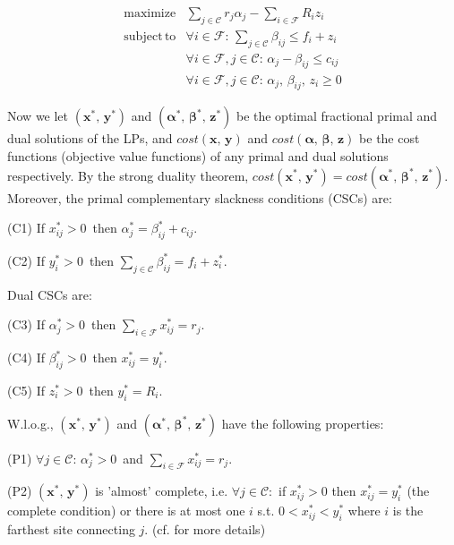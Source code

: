\documentclass[10pt]{llncs}
\begin{document}
{\small 
\begin{equation}
\begin{array}{llc}
\textrm{maximize} & \sum_{j\in\mathcal{C}}r_{j}\alpha_{j}-\sum_{i\in\mathcal{F}}R_{i}z_{i}\\
\mathrm{subject\, to} & \forall i\in\mathcal{F}:\,\sum_{j\in\mathcal{C}}\beta_{ij}\leq f_{i}+z_{i}\\
 & \forall i\in\mathcal{F},j\in\mathcal{C}:\,\alpha_{j}-\beta_{ij}\leq c_{ij}\\
 & \forall i\in\mathcal{F},j\in\mathcal{C}:\,\alpha_{j},\,\beta_{ij},\, z_{i}\geq0
\end{array}\label{eq:ftra-dual}
\end{equation}
}{\small \par}

Now we let $\left(\boldsymbol{x^{*}},\,\boldsymbol{y^{*}}\right)$
and $\left(\boldsymbol{\alpha^{*}},\,\boldsymbol{\beta^{*}},\,\boldsymbol{z^{*}}\right)$
be the optimal fractional primal and dual solutions of the LPs, and
$cost\left(\boldsymbol{x},\,\boldsymbol{y}\right)$ and $cost\left(\boldsymbol{\alpha},\,\boldsymbol{\beta},\,\boldsymbol{z}\right)$
be the cost functions (objective value functions) of any primal and
dual solutions respectively. By the strong duality theorem, $cost\left(\boldsymbol{x^{*}},\,\boldsymbol{y^{*}}\right)=cost\left(\boldsymbol{\alpha^{*}},\,\boldsymbol{\beta^{*}},\,\boldsymbol{z^{*}}\right)$.
Moreover, the primal complementary slackness conditions (CSCs) are:

(C1) If $x_{ij}^{*}>0\,$ then $\alpha_{j}^{*}=\beta_{ij}^{*}+c_{ij}$.

(C2) If $y_{i}^{*}>0\,$ then $\sum_{j\in\mathcal{C}}\beta_{ij}^{*}=f_{i}+z_{i}^{*}$.

Dual CSCs are:

(C3) If $\alpha_{j}^{*}>0\,$ then $\sum_{i\in\mathcal{F}}x_{ij}^{*}=r_{j}$.

(C4) If $\beta_{ij}^{*}>0\,$ then $x_{ij}^{*}=y_{i}^{*}$.

(C5) If $z_{i}^{*}>0\,$ then $y_{i}^{*}=R_{i}$.

W.l.o.g., $\left(\boldsymbol{x^{*}},\,\boldsymbol{y^{*}}\right)$
and $\left(\boldsymbol{\alpha^{*}},\,\boldsymbol{\beta^{*}},\,\boldsymbol{z^{*}}\right)$
have the following properties:

(P1) $\forall j\in\mathcal{C}:\,\alpha_{j}^{*}>0\,$ and $\sum_{i\in\mathcal{F}}x_{ij}^{*}=r_{j}$.

(P2) $\left(\boldsymbol{x^{*}},\,\boldsymbol{y^{*}}\right)$ is 'almost'
complete, i.e. $\forall j\in\mathcal{C}:$ if $x_{ij}^{*}>0$ then
$x_{ij}^{*}=y_{i}^{*}$ (the complete condition) or there is at most
one $i$ s.t. $0<x_{ij}^{*}<y_{i}^{*}$ where $i$ is the farthest
site connecting $j$. (cf. \cite{Chudak0312e,Swamy08FTFL2.076} for
more details)
\end{document}

